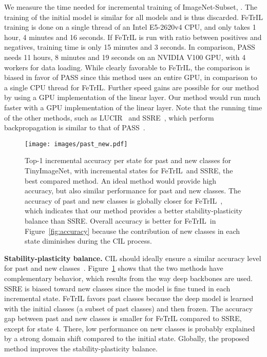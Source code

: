 \documentclass[10pt,twocolumn,letterpaper]{article}
\makeatletter
\newcommand{\ourmodel}{FeTrIL\@\xspace}
\newcommand{\ourmodelNospace}{FeTrIL}
\newcommand{\ourmodelone}{FeTrIL~}
\makeatother
\begin{document}
We measure the time needed for incremental training of ImageNet-Subset, .
The training of the initial model is similar for all models and is thus discarded.
\ourmodel training is done on a single thread of an Intel E5-2620v4 CPU, and only takes 1 hour, 4 minutes and 16 seconds. 
If \ourmodel is run with  ratio between positives and negatives, training time is only 15 minutes and 3 seconds. 
In comparison, PASS~\cite{zhu2021pass} needs 11 hours, 8 minutes and 19 seconds on an NVIDIA V100 GPU, with 4 workers for data loading.
While clearly favorable to \ourmodelNospace, the comparison is biased in favor of PASS since this method uses an entire GPU, in comparison to a single CPU thread for \ourmodel. 
Further speed gains are possible for our method by using a GPU implementation of the linear layer.
Our method would run much faster with a GPU implementation of the linear layer. 
Note that the running time of the other methods, such as LUCIR~\cite{hou2019_lucir} and SSRE~\cite{zhu2022self},  which perform backpropagation is similar to that of PASS~\cite{zhu2021pass}. 

\begin{figure}
\centering
    \texttt{[image: images/past\_new.pdf]}\\
\caption{Top-1 incremental accuracy per state for past and new classes for TinyImageNet, with  incremental states for \ourmodelone and SSRE, the best compared method. An ideal method would provide high accuracy, but also similar performance for past and new classes. The accuracy of past and new classes is globally closer for \ourmodelone, which indicates that our method provides a better stability-plasticity balance than SSRE. Overall accuracy is better for \ourmodelone in Figure~\ref{fig:accuracy} because the contribution of new classes in each state diminishes during the CIL process.
}
\vspace{-4mm}
\label{fig:balance}
\end{figure}

\textbf{Stability-plasticity balance.}
CIL should ideally ensure a similar accuracy level for past and new classes~\cite{masana2021_study,zhu2022self}.
Figure~\ref{fig:balance} shows that the two methods have complementary behavior, which results from the way deep backbones are used.
SSRE is biased toward new classes since the model is fine tuned in each incremental state.
\ourmodel favors past classes because the deep model is learned with the initial classes (a subset of past classes) and then frozen.
The accuracy gap between past and new classes is smaller for \ourmodel compared to SSRE, except for state 4.
There, low performance on new classes is probably explained by a strong domain shift compared to the initial state. 
Globally, the proposed method improves the stability-plasticity balance.
\end{document}
